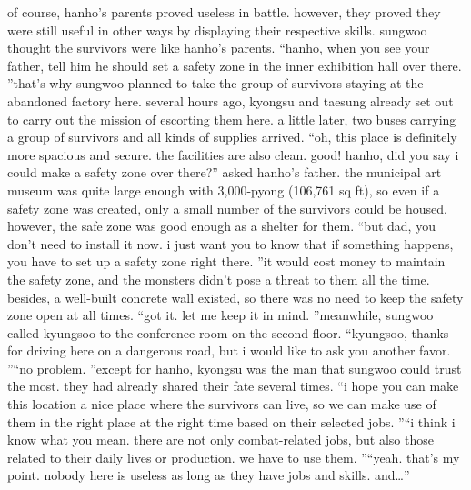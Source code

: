 of course, hanho’s parents proved useless in battle.
 however, they proved they were still useful in other ways by displaying their respective skills.
 sungwoo thought the survivors were like hanho’s parents.
“hanho, when you see your father, tell him he should set a safety zone in the inner exhibition hall over there.
”that’s why sungwoo planned to take the group of survivors staying at the abandoned factory here.
 several hours ago, kyongsu and taesung already set out to carry out the mission of escorting them here.
a little later, two buses carrying a group of survivors and all kinds of supplies arrived.
“oh, this place is definitely more spacious and secure.
 the facilities are also clean.
 good! hanho, did you say i could make a safety zone over there?” asked hanho’s father.
the municipal art museum was quite large enough with 3,000-pyong (106,761 sq ft), so even if a safety zone was created, only a small number of the survivors could be housed.
however, the safe zone was good enough as a shelter for them.
“but dad, you don’t need to install it now.
 i just want you to know that if something happens, you have to set up a safety zone right there.
”it would cost money to maintain the safety zone, and the monsters didn’t pose a threat to them all the time.
 besides, a well-built concrete wall existed, so there was no need to keep the safety zone open at all times.
“got it.
 let me keep it in mind.
”meanwhile, sungwoo called kyungsoo to the conference room on the second floor.
“kyungsoo, thanks for driving here on a dangerous road, but i would like to ask you another favor.
”“no problem.
”except for hanho, kyongsu was the man that sungwoo could trust the most.
 they had already shared their fate several times.
“i hope you can make this location a nice place where the survivors can live, so we can make use of them in the right place at the right time based on their selected jobs.
”“i think i know what you mean.
 there are not only combat-related jobs, but also those related to their daily lives or production.
 we have to use them.
”“yeah.
 that’s my point.
 nobody here is useless as long as they have jobs and skills.
 and…”

 